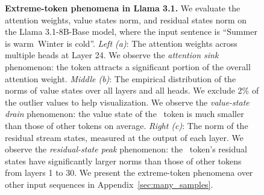 \begin{figure}[t]
  \vspace{-0.5em}
  \caption{\small \textbf{Extreme-token phenomena in Llama 3.1.}
  We evaluate the attention weights, value states norm, and residual states norm on the Llama 3.1-8B-Base model, where the input sentence is ``\bos Summer is warm\period~Winter is cold\period''.  \textit{Left (a)}: The attention weights across multiple heads at Layer 24. We observe the \textit{attention sink} phenomenon: the \bos{} token attracts a significant portion of the overall attention weight.
  \textit{Middle (b)}: The empirical distribution of the norms of value states over all layers 
  and all heads. We exclude 2\% of the outlier values to help visualization. We observe the \textit{value-state drain} phenomenon: the value state of the \bos~token is much smaller than those of other tokens on average.
  \textit{Right (c)}: The norm of the residual stream states, measured at the output of each layer. We observe the \textit{residual-state peak} phenomenon: the \bos~token's residual states have significantly larger norms than those of other tokens from layers 1 to 30. We present the extreme-token phenomena over other input sequences in Appendix~\ref{sec:many_samples}.
  }
  \label{figure:extreme-token}
  \vspace{-1em}
\end{figure}

